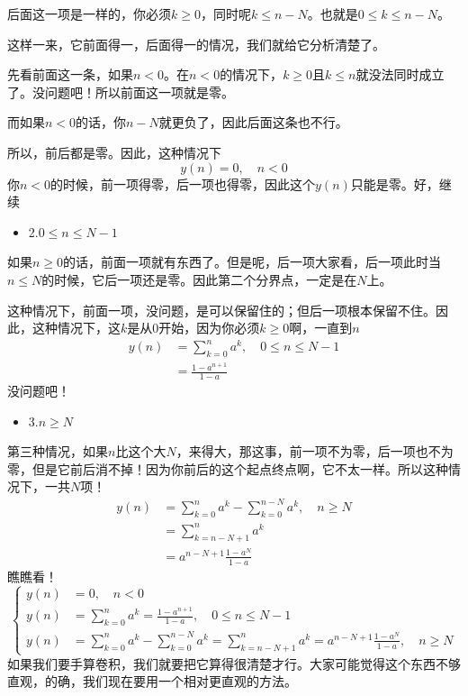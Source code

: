 \documentclass[a4paper,12pt]{article}
\begin{document}
后面这一项是一样的，你必须$k\ge 0$，同时呢$k\le n-N$。也就是$0 \le k \le n-N$。

这样一来，它前面得一，后面得一的情况，我们就给它分析清楚了。

先看前面这一条，如果$n<0$。在$n<0$的情况下，$k\ge 0$且$k\le n$就没法同时成立了。没问题吧！所以前面这一项就是零。

而如果$n<0$的话，你$n-N$就更负了，因此后面这条也不行。

所以，前后都是零。因此，这种情况下
\begin{equation}
   y(n) = 0 ,\quad n<0
\end{equation}
你$n<0$的时候，前一项得零，后一项也得零，因此这个$y(n)$只能是零。好，继续
\begin{itemize}
    \item 2.\quad$0 \le n \le N-1$
\end{itemize}

如果$n\ge 0$的话，前面一项就有东西了。但是呢，后一项大家看，后一项此时当$n \le N$的时候，它后一项还是零。因此第二个分界点，一定是在$N$上。

这种情况下，前面一项，没问题，是可以保留住的；但后一项根本保留不住。因此，这种情况下，这$k$是从$0$开始，因为你必须$k\ge 0$啊，一直到$n$
\begin{equation}
\begin{aligned}
   y(n) &= \sum_{k=0}^na^k,\quad 0 \le n \le N-1\\
&=\frac{1-a^{n+1}}{1-a}
\end{aligned}
\end{equation}
没问题吧！
\begin{itemize}
    \item 3.\quad$n \ge N$
\end{itemize}

第三种情况，如果$n$比这个大$N$，来得大，那这事，前一项不为零，后一项也不为零，但是它前后消不掉！因为你前后的这个起点终点啊，它不太一样。所以这种情况下，一共$N$项！
\begin{equation}
\begin{aligned}
   y(n) &= \sum_{k=0}^na^k - \sum_{k=0}^{n-N}a^k,\quad n \ge N\\
&=\sum_{k=n-N+1}^n a^k\\
&=a^{n-N+1}\frac{1-a^{N}}{1-a} 
\end{aligned}
\end{equation}
瞧瞧看！
\begin{equation}
\left\{\begin{aligned}
y(n) &= 0 ,\quad n<0\\
    y(n) &= \sum_{k=0}^na^k
=\frac{1-a^{n+1}}{1-a},\quad 0 \le n \le N-1
\\
    y(n) &= \sum_{k=0}^na^k - \sum_{k=0}^{n-N}a^k=\sum_{k=n-N+1}^n a^k=a^{n-N+1}\frac{1-a^{N}}{1-a} ,\quad n \ge N
\end{aligned}\right.
\end{equation}
如果我们要手算卷积，我们就要把它算得很清楚才行。大家可能觉得这个东西不够直观，的确，我们现在要用一个相对更直观的方法。
\end{document}
